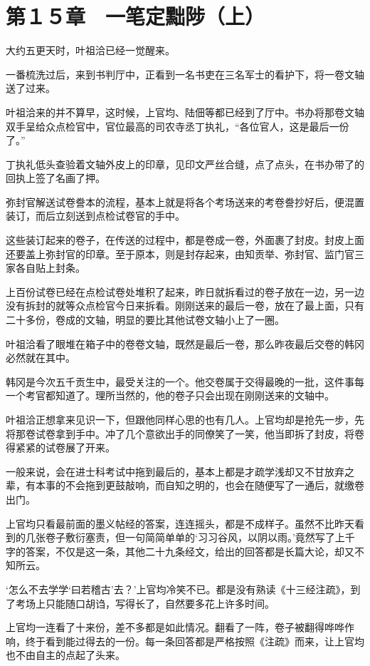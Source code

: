 \section{第１５章　一笔定黜陟（上）}

大约五更天时，叶祖洽已经一觉醒来。

一番梳洗过后，来到书判厅中，正看到一名书吏在三名军士的看护下，将一卷文轴送了过来。

叶祖洽来的并不算早，这时候，上官均、陆佃等都已经到了厅中。书办将那卷文轴双手呈给众点检官中，官位最高的司农寺丞丁执礼，“各位官人，这是最后一份了。”

丁执礼低头查验着文轴外皮上的印章，见印文严丝合缝，点了点头，在书办带了的回执上签了名画了押。

弥封官解送试卷誊本的流程，基本上就是将各个考场送来的考卷誊抄好后，便混置装订，而后立刻送到点检试卷官的手中。

这些装订起来的卷子，在传送的过程中，都是卷成一卷，外面裹了封皮。封皮上面还要盖上弥封官的印章。至于原本，则是封存起来，由知贡举、弥封官、监门官三家各自贴上封条。

上百份试卷已经在点检试卷处堆积了起来，昨日就拆看过的卷子放在一边，另一边没有拆封的就等众点检官今日来拆看。刚刚送来的最后一卷，放在了最上面，只有二十多份，卷成的文轴，明显的要比其他试卷文轴小上了一圈。

叶祖洽看了眼堆在箱子中的卷卷文轴，既然是最后一卷，那么昨夜最后交卷的韩冈必然就在其中。

韩冈是今次五千贡生中，最受关注的一个。他交卷属于交得最晚的一批，这件事每一个考官都知道了。理所当然的，他的卷子只会出现在刚刚送来的文轴中。

叶祖洽正想拿来见识一下，但跟他同样心思的也有几人。上官均却是抢先一步，先将那卷试卷拿到手中。冲了几个意欲出手的同僚笑了一笑，他当即拆了封皮，将卷得紧紧的试卷展了开来。

一般来说，会在进士科考试中拖到最后的，基本上都是才疏学浅却又不甘放弃之辈，有本事的不会拖到更鼓敲响，而自知之明的，也会在随便写了一通后，就缴卷出门。

上官均只看最前面的墨义帖经的答案，连连摇头，都是不成样子。虽然不比昨天看到的几张卷子敷衍塞责，但一句简简单单的‘习习谷风，以阴以雨。’竟然写了上千字的答案，不仅是这一条，其他二十九条经文，给出的回答都是长篇大论，却又不知所云。

‘怎么不去学学‘曰若稽古’去？’上官均冷笑不已。都是没有熟读《十三经注疏》，到了考场上只能随口胡诌，写得长了，自然要多花上许多时间。

上官均一连看了十来份，差不多都是如此情况。翻看了一阵，卷子被翻得哗哗作响，终于看到能过得去的一份。每一条回答都是严格按照《注疏》而来，让上官均也不由自主的点起了头来。

